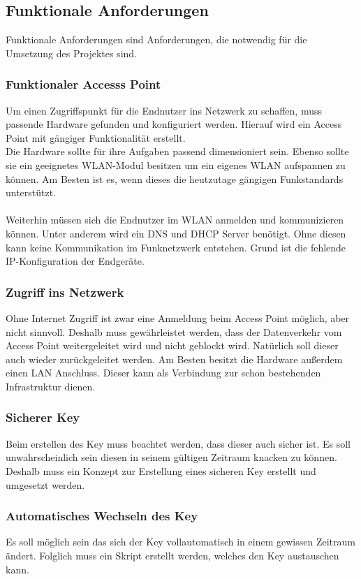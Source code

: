 \documentclass[a4paper,11pt,singlespacing]{article}
\begin{document}
			\subsection{Funktionale Anforderungen}
			Funktionale Anforderungen sind Anforderungen, die notwendig für die Umsetzung des Projektes sind.
            \subsubsection{Funktionaler Accesss Point}
                Um einen Zugriffspunkt für die Endnutzer ins Netzwerk zu schaffen, muss passende Hardware gefunden und konfiguriert werden. Hierauf wird ein Access Point mit gängiger Funktionalität erstellt.\\ 
                Die Hardware sollte für ihre Aufgaben passend dimensioniert sein. Ebenso sollte sie ein geeignetes WLAN-Modul besitzen um ein eigenes WLAN aufspannen zu können. Am Besten ist es, wenn dieses die heutzutage gängigen Funkstandards unterstützt.\\\\
                Weiterhin müssen sich die Endnutzer im WLAN anmelden und kommunizieren können. Unter anderem wird ein DNS und DHCP Server benötigt. Ohne diesen kann keine Kommunikation im Funknetzwerk entstehen. Grund ist die fehlende IP-Konfiguration der Endgeräte.
                \subsubsection{Zugriff ins Netzwerk}
                    Ohne Internet Zugriff ist zwar eine Anmeldung beim Access Point möglich, aber nicht sinnvoll.
                    Deshalb muss gewährleistet werden, dass der Datenverkehr vom Access Point weitergeleitet wird und nicht geblockt wird. Natürlich soll dieser auch wieder zurückgeleitet werden. Am Besten besitzt die Hardware außerdem einen LAN Anschluss. Dieser kann als Verbindung zur schon bestehenden Infrastruktur dienen.
                \subsubsection{Sicherer Key}
                    Beim erstellen des Key muss beachtet werden, dass dieser auch sicher ist. Es soll unwahrscheinlich sein diesen in seinem gültigen Zeitraum knacken zu können. Deshalb muss ein Konzept zur Erstellung eines sicheren Key erstellt und umgesetzt werden. 
    			\subsubsection{Automatisches Wechseln des Key}
    			    Es soll möglich sein das sich der Key vollautomatisch in einem gewissen Zeitraum ändert. Folglich muss ein Skript erstellt werden, welches den Key austauschen kann.
\end{document}
